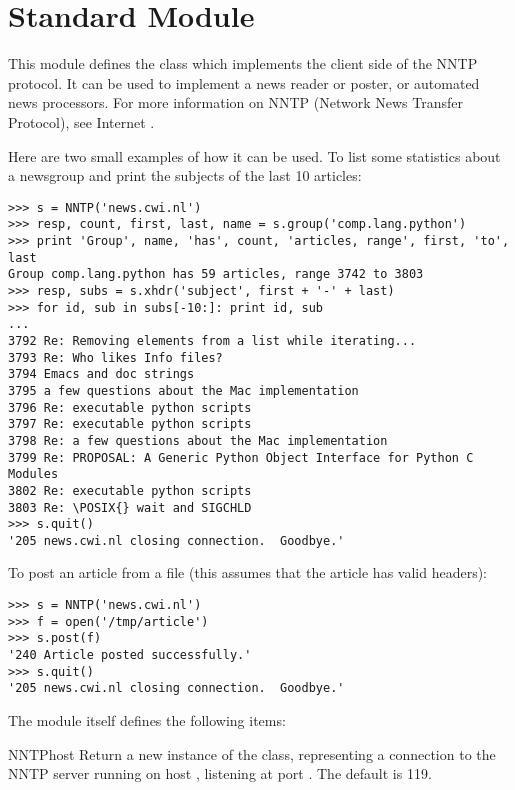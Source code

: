 \section{Standard Module }




This module defines the class  which implements the client
side of the NNTP protocol.  It can be used to implement a news reader
or poster, or automated news processors.  For more information on NNTP
(Network News Transfer Protocol), see Internet .

Here are two small examples of how it can be used.  To list some
statistics about a newsgroup and print the subjects of the last 10
articles:

\begin{verbatim}
>>> s = NNTP('news.cwi.nl')
>>> resp, count, first, last, name = s.group('comp.lang.python')
>>> print 'Group', name, 'has', count, 'articles, range', first, 'to', last
Group comp.lang.python has 59 articles, range 3742 to 3803
>>> resp, subs = s.xhdr('subject', first + '-' + last)
>>> for id, sub in subs[-10:]: print id, sub
... 
3792 Re: Removing elements from a list while iterating...
3793 Re: Who likes Info files?
3794 Emacs and doc strings
3795 a few questions about the Mac implementation
3796 Re: executable python scripts
3797 Re: executable python scripts
3798 Re: a few questions about the Mac implementation 
3799 Re: PROPOSAL: A Generic Python Object Interface for Python C Modules
3802 Re: executable python scripts 
3803 Re: \POSIX{} wait and SIGCHLD
>>> s.quit()
'205 news.cwi.nl closing connection.  Goodbye.'
\end{verbatim}

To post an article from a file (this assumes that the article has
valid headers):

\begin{verbatim}
>>> s = NNTP('news.cwi.nl')
>>> f = open('/tmp/article')
>>> s.post(f)
'240 Article posted successfully.'
>>> s.quit()
'205 news.cwi.nl closing connection.  Goodbye.'
\end{verbatim}
%
The module itself defines the following items:

\begin{classdesc}{NNTP}{host}
Return a new instance of the  class, representing a
connection to the NNTP server running on host , listening at
port .  The default  is 119.
\end{classdesc}

